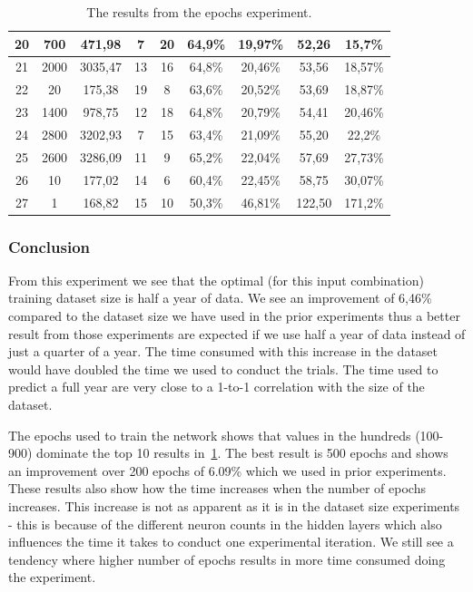 \begin{table}[H]
{\begin{tabular}{|c|c|c|c|c|c|c|c|c|}
	20 & 700  & 471,98 & 7  & 20 & 64,9\% & 19,97\% & 52,26 & 15,7\% \\ \hline
	21 & 2000 & 3035,47 & 13 & 16 & 64,8\% & 20,46\% & 53,56 & 18,57\% \\ \hline
	22 & 20   & 175,38 & 19 & 8  & 63,6\% & 20,52\% & 53,69 & 18,87\% \\ \hline
	23 & 1400 & 978,75 & 12 & 18 & 64,8\% & 20,79\% & 54,41 & 20,46\% \\ \hline
	24 & 2800 & 3202,93 & 7  & 15 & 63,4\% & 21,09\% & 55,20 & 22,2\% \\ \hline
	25 & 2600 & 3286,09 & 11 & 9  & 65,2\% & 22,04\% & 57,69 & 27,73\% \\ \hline
	26 & 10   & 177,02 & 14 & 6  & 60,4\% & 22,45\% & 58,75 & 30,07\% \\ \hline
	27 & 1    & 168,82 & 15 & 10 & 50,3\% & 46,81\% & 122,50 & 171,2\% \\ \hline
	\end{tabular}
}
\caption{The results from the epochs experiment.} %
\label{table:Epochs} %
\end{table}


\subsubsection{Conclusion}
From this experiment we see that the optimal (for this input combination) training dataset size is half a year of data. We see an improvement of 6,46\% compared to the dataset size we have used in the prior experiments thus a better result from those experiments are expected if we use half a year of data instead of just a quarter of a year. The time consumed with this increase in the dataset would have doubled the time we used to conduct the trials. The time used to predict a full year are very close to a 1-to-1 correlation with the size of the dataset.

The epochs used to train the network shows that values in the hundreds (100-900) dominate the top 10 results in~\ref{table:Epochs}. The best result is 500 epochs and shows an improvement over 200 epochs of 6.09\% which we used in prior experiments. These results also show how the time increases when the number of epochs increases. This increase is not as apparent as it is in the dataset size experiments - this is because of the different neuron counts in the hidden layers which also influences the time it takes to conduct one experimental iteration. We still see a tendency where higher number of epochs results in more time consumed doing the experiment.

